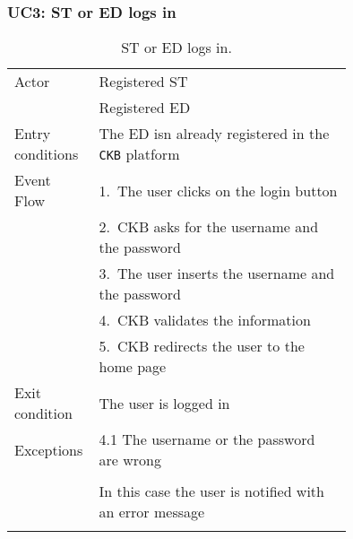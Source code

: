 \subsubsection*{UC3: ST or ED logs in}
\begin{center}
  \begin{longtable}{l|p{0.75\linewidth}}
    \hline
    Actor & Registered ST \\
    & Registered ED \\
    \hline
    Entry conditions & The ED isn already registered in the \verb|CKB| platform \\
    \hline
    Event Flow & 1.\ The user clicks on the login button \\
    & 2.\ CKB asks for the username and the password \\
    & 3.\ The user inserts the username and the password \\
    & 4.\ CKB validates the information \\
    & 5.\ CKB redirects the user to the home page \\
    \hline
    Exit condition & The user is logged in \\
    \hline
    Exceptions & 4.1 The username or the password are wrong \\ \\
    & In this case the user is notified with an error message \\
    \hline
    \caption{ST or ED logs in.}
    \label{tab: ST_or_ED_logs_in}
  \end{longtable}
\end{center}

